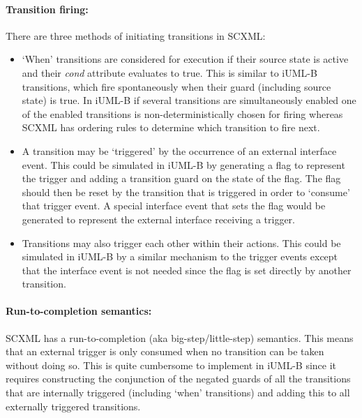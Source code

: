 \paragraph{Transition firing:}
There are three methods of initiating transitions in SCXML:
\begin{itemize}
\item `When' transitions are considered for execution if their source state is active and their \emph{cond} attribute evaluates to true. 
This is similar to iUML-B transitions, which fire spontaneously when their guard (including source state) is true.
In iUML-B if several transitions are simultaneously enabled one of the enabled transitions is non-deterministically chosen for firing whereas 
SCXML has ordering rules to determine which transition to fire next.
\item A transition may be `triggered' by the occurrence of an external interface event. 
This could be simulated in iUML-B by generating a flag to represent the trigger and adding a transition guard on the state of the flag. 
The flag should then be reset by the transition that is triggered in order to `consume' that trigger event.
 A special interface event that sets the flag would be generated to represent the external interface receiving a trigger.
\item Transitions may also trigger each other within their actions. 
This could be simulated in iUML-B by a similar mechanism to the trigger events except that the interface event is not needed since the flag is set directly by another transition.
\vspace{-0.10cm}
\end{itemize}

\paragraph{Run-to-completion semantics:} 
SCXML has a run-to-completion (aka big-step/little-step) semantics.
 This means that an external trigger is only consumed when no transition can be taken without doing so. 
This is quite cumbersome to implement in iUML-B since it requires constructing the conjunction of the negated guards of all the transitions that are internally triggered (including `when' transitions) and adding this to all externally triggered transitions.
\vspace{-0.10cm}

